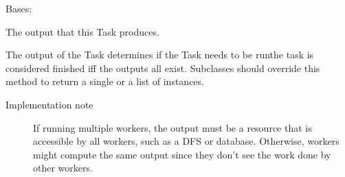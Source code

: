 \documentclass[letterpaper,10pt,english]{sphinxmanual}
\begin{document}

\begin{fulllineitems}
\label{\detokenize{documentation/b2luigi.basf2_helper:b2luigi.basf2_helper.tasks.MergerTask}}
Bases: {\hyperref[\detokenize{documentation/b2luigi.basf2_helper:b2luigi.basf2_helper.tasks.Basf2Task}]{}}

\begin{fulllineitems}
\label{\detokenize{documentation/b2luigi.basf2_helper:b2luigi.basf2_helper.tasks.MergerTask.cmd}}
\end{fulllineitems}


\begin{fulllineitems}
\label{\detokenize{documentation/b2luigi.basf2_helper:b2luigi.basf2_helper.tasks.MergerTask.output}}
The output that this Task produces.

The output of the Task determines if the Task needs to be run\textendash{}the task
is considered finished iff the outputs all exist. Subclasses should
override this method to return a single  or a list of
 instances.
\begin{description}
\item[{Implementation note}] \leavevmode
If running multiple workers, the output must be a resource that is accessible
by all workers, such as a DFS or database. Otherwise, workers might compute
the same output since they don’t see the work done by other workers.

\end{description}


\end{fulllineitems}
\end{fulllineitems}
\end{document}
